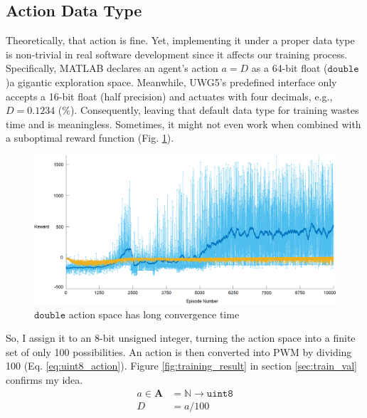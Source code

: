 \documentclass[../main.tex]{subfiles}
\begin{document}
\subsection{Action Data Type}
Theoretically, that action is fine. Yet, implementing it under a proper data type is non-trivial in real software development since it affects our training process. Specifically, MATLAB declares an agent's action $a = D$ as a 64-bit float ($\mathtt{double}$)\textemdash a gigantic exploration space. Meanwhile, UWG5's predefined interface only accepts a 16-bit float (half precision) and actuates with four decimals, e.g., $D = 0.1234$ (\%). Consequently, leaving that default data type for training wastes time and is meaningless. Sometimes, it might not even work when combined with a suboptimal reward function (Fig. \ref{fig:double_action}). 
\begin{figure}[htbp]
    \centering
    \includegraphics[width=1\linewidth]{figures/double_action.png}
    \caption{$\mathtt{double}$ action space has long convergence time}
    \label{fig:double_action}
\end{figure}
So, I assign it to an 8-bit unsigned integer, turning the action space into a finite set of only 100 possibilities. An action is then converted into PWM by dividing 100 (Eq. \ref{eq:uint8_action}). Figure \ref{fig:training_result} in section \ref{sec:train_val} confirms my idea.
\begin{equation}
\begin{split}
    a \in \mathbf{A} &= \mathbb{N} \rightarrow \mathtt{uint8} \\
    D &= a/100
\end{split}
\label{eq:uint8_action}
\end{equation}
\end{document}
